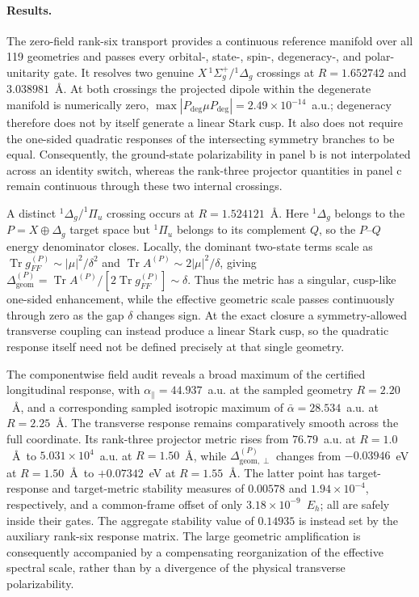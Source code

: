 \paragraph{Results.}
The zero-field rank-six transport provides a continuous reference manifold
over all 119 geometries and passes every orbital-, state-, spin-, degeneracy-,
and polar-unitarity gate. It resolves two genuine
$X\,^1\Sigma_g^+/{}^1\Delta_g$ crossings at $R=1.652742$ and
$3.038981$~\AA. At both crossings the projected dipole within the degenerate
manifold is numerically zero,
$\max|P_{\mathrm{deg}}\mu P_{\mathrm{deg}}|=2.49\times10^{-14}$~a.u.;
degeneracy therefore does not by itself generate a linear Stark cusp.
It also does not require the one-sided quadratic responses of the intersecting
symmetry branches to be equal. Consequently, the ground-state polarizability
in panel b is not interpolated across an identity switch, whereas the
rank-three projector quantities in panel c remain continuous through these
two internal crossings.

A distinct $^1\Delta_g/^1\Pi_u$ crossing occurs at $R=1.524121$~\AA.
Here $^1\Delta_g$ belongs to the $P=X\oplus\Delta_g$ target space but
$^1\Pi_u$ belongs to its complement $Q$, so the $P$--$Q$ energy denominator
closes. Locally, the dominant two-state terms scale as
$\operatorname{Tr}g_{FF}^{(P)}\sim |\mu|^2/\delta^2$ and
$\operatorname{Tr}A^{(P)}\sim2|\mu|^2/\delta$, giving
$\Delta_{\mathrm{geom}}^{(P)}=\operatorname{Tr}A^{(P)}/
[2\operatorname{Tr}g_{FF}^{(P)}]\sim\delta$. Thus the metric has a
singular, cusp-like one-sided enhancement, while the effective geometric
scale passes continuously through zero as the gap $\delta$ changes sign.
At the exact closure a symmetry-allowed transverse coupling can instead
produce a linear Stark cusp, so the quadratic response itself need not be
defined precisely at that single geometry.

The componentwise field audit reveals a broad maximum of the certified
longitudinal response, with $\alpha_\parallel=44.937$~a.u. at the sampled
geometry $R=2.20$~\AA, and a corresponding sampled isotropic maximum of
$\bar\alpha=28.534$~a.u. at $R=2.25$~\AA. The transverse response remains
comparatively smooth across the full coordinate. Its rank-three projector
metric rises from $76.79$~a.u. at $R=1.0$~\AA\ to
$5.031\times10^{4}$~a.u. at $R=1.50$~\AA, while
$\Delta_{\mathrm{geom},\perp}^{(P)}$ changes from $-0.03946$~eV at
$R=1.50$~\AA\ to $+0.07342$~eV at $R=1.55$~\AA. The latter point has
target-response and target-metric stability measures of $0.00578$ and
$1.94\times10^{-4}$, respectively, and a common-frame offset of only
$3.18\times10^{-9}$~$E_h$; all are safely inside their gates. The aggregate
stability value of $0.14935$ is instead set by the auxiliary rank-six
response matrix. The large geometric amplification is consequently
accompanied by a compensating reorganization of the effective spectral scale,
rather than by a divergence of the physical transverse polarizability.

